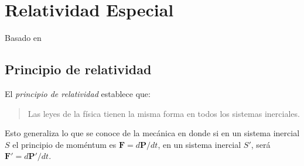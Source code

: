\chapter{Relatividad Especial}
\label{cha:relatividad-especial}
Basado en \cite{rs,rse,rsf,rsg} %
\section{Principio de relatividad}
\begin{frame}
El \emph{principio de relatividad} establece que:
\begin{quote}
  Las leyes de la física tienen la misma forma en todos los sistemas inerciales. 
\end{quote}
Esto generaliza lo que se conoce de la mecánica en donde si en un sistema inercial $S$ el principio de moméntum  es $\mathbf{F}=d\mathbf{P}/dt$, en un sistema inercial $S'$, será $\mathbf{F}'=d\mathbf{P}'/dt$.
\end{frame}

